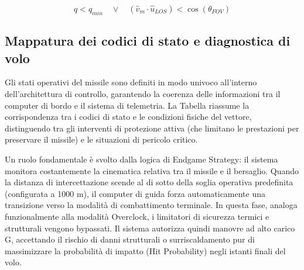 \documentclass[12pt,a4paper]{article}
\begin{document}
\[
q < q_{min} \quad \lor \quad (\hat{v}_m \cdot \hat{u}_{LOS}) < \cos\left(\theta_{FOV}\right)
\]

\subsection{Mappatura dei codici di stato e diagnostica di volo}
Gli stati operativi del missile sono definiti in modo univoco all'interno dell'architettura di controllo, garantendo la coerenza delle informazioni tra il computer di bordo e il sistema di telemetria. La Tabella riassume la corrispondenza tra i codici di stato e le condizioni fisiche del vettore, distinguendo tra gli interventi di protezione attiva (che limitano le prestazioni per preservare il missile) e le situazioni di pericolo critico.

Un ruolo fondamentale è svolto dalla logica di Endgame Strategy: il sistema monitora costantemente la cinematica relativa tra il missile e il bersaglio. Quando la distanza di intercettazione scende al di sotto della soglia operativa predefinita (configurata a 1000 m), il computer di guida forza automaticamente una transizione verso la modalità di combattimento terminale. In questa fase, analoga funzionalmente alla modalità Overclock, i limitatori di sicurezza termici e strutturali vengono bypassati. Il sistema autorizza quindi manovre ad alto carico G, accettando il rischio di danni strutturali o surriscaldamento pur di massimizzare la probabilità di impatto (Hit Probability) negli istanti finali del volo.
\end{document}
